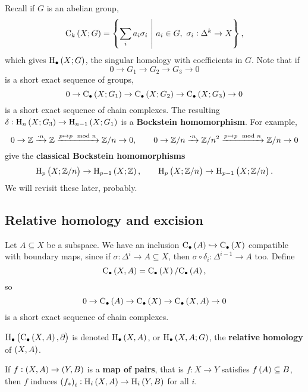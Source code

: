 \begin{example*}
Recall if $ G $ is an abelian group,
$$ \C_k\br{X; G} = \cbr{\sum_i a_i\sigma_i \st a_i \in G, \ \sigma_i : \Delta^k \to X}, $$
which gives $ \H_\bullet\br{X; G} $, the singular homology with coefficients in $ G $. Note that if
$$ 0 \to G_1 \to G_2 \to G_3 \to 0 $$
is a short exact sequence of groups,
$$ 0 \to \C_\bullet\br{X; G_1} \to \C_\bullet\br{X; G_2} \to \C_\bullet\br{X; G_3} \to 0 $$
is a short exact sequence of chain complexes. The resulting $ \delta : \H_n\br{X; G_3} \to \H_{n - 1}\br{X; G_1} $ is a \textbf{Bockstein homomorphism}. For example,
$$ 0 \to \mathbb{Z} \xrightarrow{\cdot n} \mathbb{Z} \xrightarrow{p \mapsto p \mod n} \mathbb{Z} / n \to 0, \qquad 0 \to \mathbb{Z} / n \xrightarrow{\cdot n} \mathbb{Z} / n^2 \xrightarrow{p \mapsto p \mod n} \mathbb{Z} / n \to 0 $$
give the \textbf{classical Bockstein homomorphisms}
$$ \H_p\br{X; \ZZ / n} \to \H_{p - 1}\br{X; \ZZ}, \qquad \H_p\br{X; \ZZ / n} \to \H_{p - 1}\br{X; \ZZ / n}. $$
We will revisit these later, probably.
\end{example*}

\subsection{Relative homology and excision}

\begin{example*}
Let $ A \subseteq X $ be a subspace. We have an inclusion $ \C_\bullet\br{A} \hookrightarrow \C_\bullet\br{X} $ compatible with boundary maps, since if $ \sigma : \Delta^i \to A \subseteq X $, then $ \sigma \circ \delta_i : \Delta^{i - 1} \to A $ too. Define
$$ \C_\bullet\br{X, A} = \C_\bullet\br{X} / \C_\bullet\br{A}, $$
so
$$ 0 \to \C_\bullet\br{A} \to \C_\bullet\br{X} \to \C_\bullet\br{X, A} \to 0 $$
is a short exact sequence of chain complexes.
\end{example*}

\begin{definition*}
$ \H_\bullet\br{\C_\bullet\br{X, A}, \da} $ is denoted $ \H_\bullet\br{X, A} $, or $ \H_\bullet\br{X, A; G} $, the \textbf{relative homology} of $ \br{X, A} $.
\end{definition*}

\pagebreak

\begin{lemma}
If $ f : \br{X, A} \to \br{Y, B} $ is a \textbf{map of pairs}, that is $ f : X \to Y $ satisfies $ f\br{A} \subseteq B $, then $ f $ induces $ \br{f_*}_i : \H_i\br{X, A} \to \H_i\br{Y, B} $ for all $ i $.
\end{lemma}

